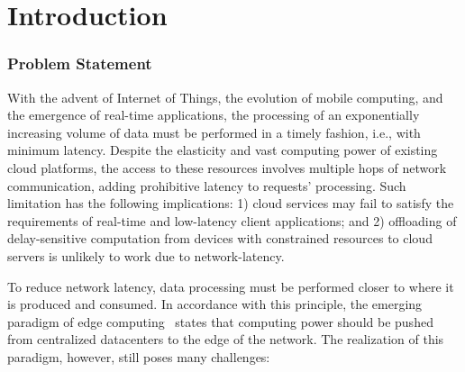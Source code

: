 \section{Introduction}

\subsubsection*{Problem Statement}

With the advent of Internet of Things, the evolution of mobile computing, and the emergence of real-time applications, the processing of an exponentially increasing volume of data must be performed in a timely fashion, i.e., with minimum latency. Despite the elasticity and vast computing power of existing cloud platforms, the access to these resources involves multiple hops of network communication, adding prohibitive latency to requests' processing. Such limitation has the following implications: 1) cloud services may fail to satisfy the requirements of real-time and low-latency client applications; and 2) offloading of delay-sensitive computation from devices with constrained resources to cloud servers is unlikely to work due to network-latency.

%
%
%


To reduce network latency, data processing must be performed closer to where it is produced and consumed. In accordance with this principle, the emerging paradigm of edge computing~\cite{} states that computing power should be pushed from centralized datacenters to the edge of the network. 
The realization of this paradigm, however, still poses many challenges:

